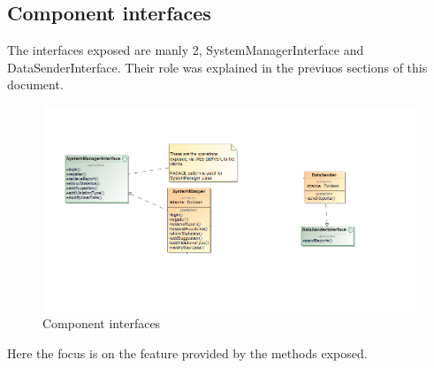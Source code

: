 \subsection{Component interfaces}

The interfaces exposed are manly 2, SystemManagerInterface and DataSenderInterface. Their role was explained in the previuos sections of this document.

\begin{figure}[H]
	\centering
	\includegraphics[width=1.12\linewidth]{Images/ComponentInterfaces.png}
	\caption{Component interfaces}
\end{figure}


Here the focus is on the feature provided by the methods exposed.

